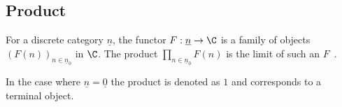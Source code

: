\subsection{Product}

\begin{definition}[Product]\label{def:product_limit}

	For a discrete category $\underline{n}$, the functor $F:\underline{n}\to \C$
	is a family of objects $(F(n))_{n\in \underline{n}_0}$ in $\C$. The product
	$\prod\limits_{n\in \underline{n}_0} F(n)$ is the limit of such an
	$F$~\parencite[p.~108]{leinster:basic_category_theory}.
\end{definition}

\begin{remark}
	In the case where $\underline{n}=\underline{0}$ the product is denoted as $1$
	and corresponds to a terminal object.
\end{remark}



